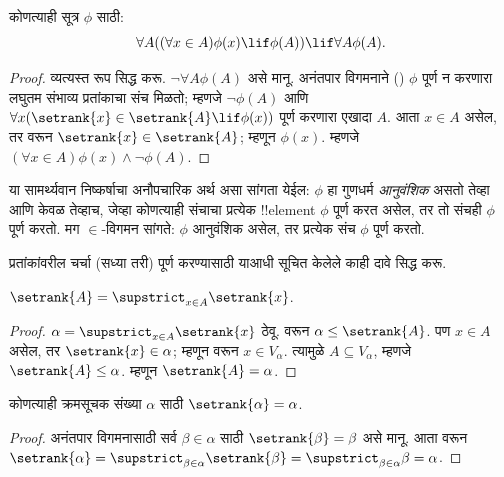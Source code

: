 \documentclass[../../../include/open-logic-section]{subfiles}
\begin{document}
\begin{thm}[$\in$-विगमन रूपबंध]
कोणत्याही सूत्र $\phi$ साठी:
\[
	\forall A((\forall x \in A)\phi(x) \lif \phi(A)) \lif \forall A \phi(A).
\]
\end{thm}

\begin{proof}
व्यत्यस्त रूप सिद्ध करू. $\lnot \forall A
\phi(A)$ असे मानू. अनंतपार विगमनाने () $\phi$ पूर्ण न करणारा लघुतम संभाव्य प्रतांकाचा संच मिळतो; म्हणजे $\lnot \phi(A)$ आणि $\forall x(\setrank{x} \in \setrank{A}
\lif \phi(x))$ पूर्ण करणारा एखादा $A$. आता $x \in A$ असेल, तर  वरून $\setrank{x} \in
\setrank{A}$; म्हणून $\phi(x)$. म्हणजे $(\forall x \in
A)\phi(x) \land \lnot \phi(A)$.
\end{proof}\noindent या सामर्थ्यवान निष्कर्षाचा अनौपचारिक अर्थ असा सांगता येईल: $\phi$ हा गुणधर्म \emph{आनुवंशिक} असतो तेव्हा आणि केवळ तेव्हाच, जेव्हा कोणत्याही संचाचा प्रत्येक !!{element} $\phi$ पूर्ण करत असेल, तर तो संचही $\phi$ पूर्ण करतो. मग $\in$-विगमन सांगते: $\phi$ आनुवंशिक असेल, तर प्रत्येक संच $\phi$ पूर्ण करतो.

प्रतांकांवरील चर्चा (सध्या तरी) पूर्ण करण्यासाठी याआधी सूचित केलेले काही दावे सिद्ध करू.

\begin{prop}
$\setrank{A} = \supstrict_{x \in A}\setrank{x}$.
\end{prop}

\begin{proof}
$\alpha = \supstrict_{x \in A}\setrank{x}$ ठेवू.  वरून $\alpha \leq \setrank{A}$. पण $x \in A$ असेल, तर $\setrank{x} \in \alpha$; म्हणून  वरून $x \in V_\alpha$. त्यामुळे $A
\subseteq V_\alpha$, म्हणजे $\setrank{A} \leq \alpha$. म्हणून $\setrank{A} = \alpha$.
\end{proof}

\begin{cor}
कोणत्याही क्रमसूचक संख्या $\alpha$ साठी $\setrank{\alpha} = \alpha$.
\end{cor}

\begin{proof}
अनंतपार विगमनासाठी सर्व $\beta \in \alpha$ साठी $\setrank{\beta} = \beta$ असे मानू. आता  वरून $\setrank{\alpha} = \supstrict_{\beta \in
\alpha}\setrank{\beta} = \supstrict_{\beta \in \alpha}\beta = \alpha$.
%
\end{proof}
\end{document}
